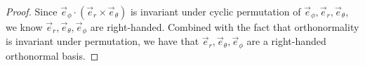\documentclass[12pt]{article}
\begin{document}
\begin{proof}
        Since $\vec{e}_\phi\cdot(\vec{e}_r\times\vec{e}_\theta)$ is invariant
        under cyclic permutation of $\vec{e}_\phi,\vec{e}_r,\vec{e}_\theta$,
        we know $\vec{e}_r,\vec{e}_\theta,\vec{e}_\phi$ are right-handed.
        Combined with the fact that
        orthonormality is invariant under permutation,
        we have that $\vec{e}_r,\vec{e}_\theta,\vec{e}_\phi$ are a right-handed
        orthonormal basis.
    \end{proof}
\end{document}
